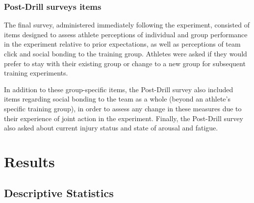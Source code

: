 \subsubsection{Post-Drill surveys items\label{app9:surveyItemsPost}}
The final survey, administered immediately following the experiment, consisted of items designed to assess athlete perceptions of individual and group performance in the experiment relative to prior expectations, as well as perceptions of team click and social bonding to the training group.  Athletes were asked if they would prefer to stay with their existing group or change to a new group for subsequent training experiments.

In addition to these group-specific items, the Post-Drill survey also included items regarding social bonding to the team as a whole (beyond an athlete's specific training group), in order to assess any change in these measures due to their experience of joint action in the experiment.  Finally, the Post-Drill survey also asked about current injury status and state of arousal and fatigue.



\section{\label{app9:results}Results}

\subsection{Descriptive Statistics\label{app9:descriptives}}




%
%
%
%
%
%
%
%
%
%
%
%

